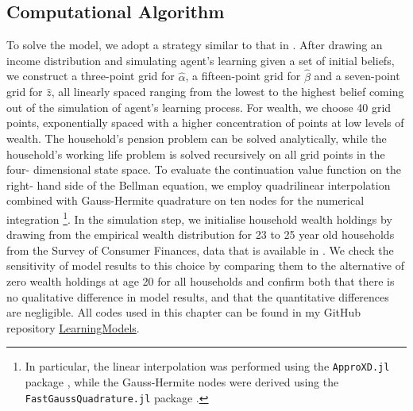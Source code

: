 \subsection{Computational Algorithm}
To solve the model, we adopt a strategy similar to that in \citet{GuvenenSmith2014}.
After drawing an income distribution and simulating agent's learning given a set
of initial beliefs, we construct a three-point grid for $\hat{\alpha}$, a 
fifteen-point grid for $\hat{\beta}$ and a seven-point grid for $\hat{z}$, all
linearly spaced ranging from the lowest to the highest belief coming out of the
simulation of agent's learning process. For wealth, we choose 40 grid points, 
exponentially spaced with a higher concentration of points at low levels of wealth.
The household's pension problem can be solved analytically, while the household's 
working life problem is solved recursively on all grid points in the four-
dimensional state space. To evaluate the continuation value function on the right-
hand side of the Bellman equation, we employ quadrilinear interpolation combined
with Gauss-Hermite quadrature on ten nodes for the numerical integration
\footnote{In particular, the linear interpolation was performed using the 
\texttt{ApproXD.jl} package \citep{Oswald2014}, while the Gauss-Hermite nodes
were derived using the \texttt{FastGaussQuadrature.jl} package \citep{Townsend2015}.}. In the
simulation step, we initialise household wealth holdings by drawing from the empirical 
wealth distribution for 23 to 25 year old households from the Survey of Consumer
Finances, data that is available in \cite{HintermaierKoeniger2011}. We check 
the sensitivity of model results to this choice by comparing them to the 
alternative of zero wealth holdings at age 20 for all households and confirm both
that there is no qualitative difference in model results, and that the quantitative
differences are negligible. All codes used in this chapter can be found in my 
GitHub repository \href{https://github.com/nilshg/LearningModels}{LearningModels}.


